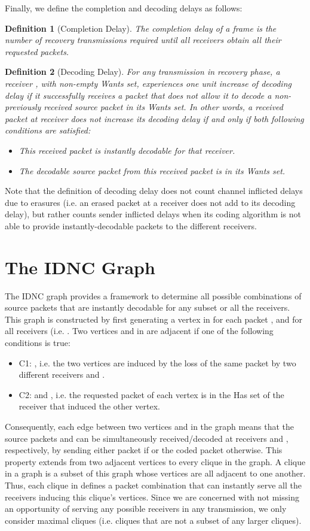 \documentclass[10pt,jounral]{IEEEtran}
\newtheorem{definition}{Definition}
\begin{document}
Finally, we define the completion and decoding delays as follows:
\begin{definition}[Completion Delay]
The completion delay of a frame is the number of recovery transmissions required until all receivers obtain all their requested packets.
\end{definition}
\begin{definition}[Decoding Delay]
For any transmission in recovery phase, a receiver , with non-empty Wants set, experiences one unit increase of \emph{decoding delay} if it successfully receives a packet that does not allow it to decode a non-previously received source packet in its Wants set. In other words, a received packet at receiver  does not increase its decoding delay if and only if both following conditions are satisfied:
\begin{itemize}
\item This received packet is instantly decodable for that receiver.
\item The decodable source packet from this received packet is in its Wants set.
\end{itemize}
\end{definition}
Note that the definition of decoding delay does not count channel inflicted delays due to erasures (i.e. an erased packet at a receiver does not add to its decoding delay), but rather counts sender inflicted delays when its coding algorithm is not able to provide instantly-decodable packets to the different receivers.


\section{The IDNC Graph} \label{sec:IDNC-graph}
The IDNC graph provides a framework to determine all possible combinations of source packets that are instantly decodable for any subset or all the receivers. This graph  is constructed by first generating a vertex  in  for each packet , and for all receivers (i.e. . Two vertices  and  in  are adjacent if one of the following conditions is
true:
\begin{itemize}
\item C1: , i.e. the two vertices are induced by the loss of the same packet  by two different receivers  and .
\item C2:  and , i.e. the requested packet of each vertex is in the Has set of the receiver that induced the other vertex.
\end{itemize}
Consequently, each edge between two vertices  and  in the graph means that the source packets  and  can be simultaneously received/decoded at receivers  and , respectively, by sending either packet  if  or the coded packet  otherwise. This property extends from two adjacent vertices to every clique in the graph. A clique in a graph is a subset of this graph whose vertices are all adjacent to one another. Thus, each clique in   defines a packet combination that can instantly serve all the receivers inducing this clique's vertices. Since we are concerned with not missing an opportunity of serving any possible receivers in any transmission, we only consider maximal cliques (i.e. cliques that are not a subset of any larger cliques).
\end{document}

